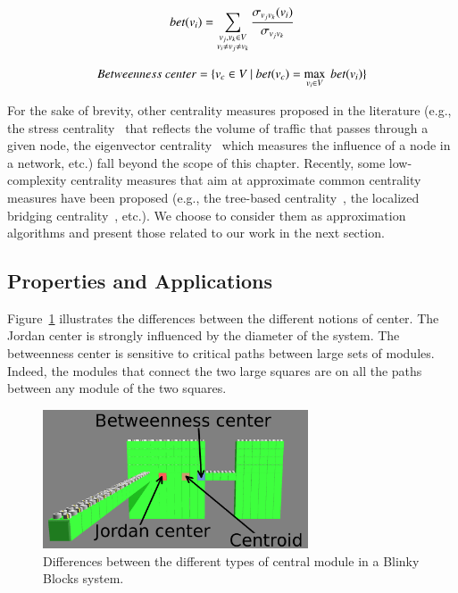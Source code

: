 \begin{equation}
\normalsize
\label{eq:betweenness}
bet(v_i) = \sum_{\substack{v_j,v_k \in V\\v_i \neq v_j \neq v_k}} \frac{\sigma_{v_jv_k}(v_i)}{\sigma_{v_jv_k}}
\end{equation}

\begin{equation}
\normalsize
\label{eq:betweenness-center}
Betweenness\ center = \{v_c \in V\ |\ bet(v_c) = \max\limits_{v_i \in V}\ bet(v_i)\}
\end{equation}

For the sake of brevity, other centrality measures proposed in the literature (e.g., the stress centrality~\cite{shimbel1953structural} that reflects the volume of traffic that passes through a given node, the eigenvector centrality~\cite{bonacich1972factoring} which measures the influence of a node in a network, etc.) fall beyond the scope of this chapter. Recently, some low-complexity centrality measures that aim at approximate common centrality measures have been proposed (e.g., the tree-based centrality~\cite{kim2013leader}, the localized bridging centrality~\cite{nanda2008localized}, etc.). We choose to consider them as approximation algorithms and present those related to our work in the next section.

\subsection{Properties and Applications}
\label{section:centrality:centers:applications}

Figure~\ref{fig:centrality:centers} illustrates the differences between the different notions of center. The Jordan center is strongly influenced by the diameter of the system. The betweenness center is sensitive to critical paths between large sets of modules. Indeed, the modules that connect the two large squares are on all the paths between any module of the two squares.

\begin{figure}[!h]
	\centering
	\includegraphics[width=0.7\textwidth]{images/centrality/central-node-types.png}
	\caption{Differences between the different types of central module in a Blinky Blocks system.\label{fig:centrality:centers}}
\end{figure}


